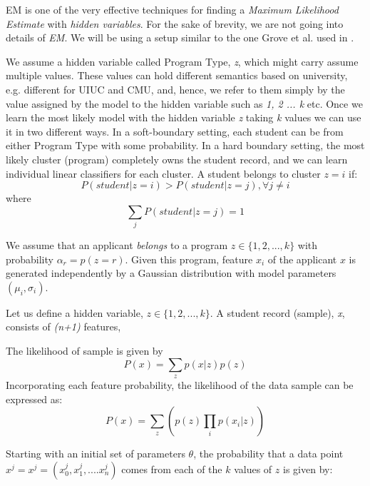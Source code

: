 \documentclass{sig-alternate-05-2015}
\begin{document}
EM is one of the very effective techniques for finding a \textit{Maximum Likelihood Estimate} with \textit{hidden variables}. For the sake of brevity, we are not going into details of \textit{EM}. We will be using a setup similar to the one Grove et al. used in \cite{GroveRoth}.

We assume a hidden variable called Program Type, \textit{z}, which might carry assume multiple values. These values can hold different semantics based on university, e.g. different for UIUC and CMU, and, hence, we refer to them simply by the value assigned by the model to the hidden variable such as \textit{1, 2 ... k} etc. Once we learn the most likely model with the hidden variable \textit{z} taking \textit{k} values we can use it in two different ways. In a soft-boundary setting, each student can be from either Program Type with some probability. In a hard boundary setting, the most likely cluster (program) completely owns the student record, and we can learn individual linear classifiers for each cluster. A student belongs to cluster $z=i$ if:
\begin{equation}P(student | z=i) > P(student | z=j), \forall {j\neq i}\end{equation}
where
\begin{equation}
\sum_j P(student | z=j) = 1
\end{equation}

We assume that an applicant \textit{belongs} to a program $ z \in \{1,2,...,k\} $ with probability $\alpha_r = p(z=r)$. Given this program, feature $x_i$ of the applicant $x$ is generated independently by a Gaussian distribution with model parameters $(\mu_i, \sigma_i)$.

Let us define a hidden variable, $ z \in \{1,2,...,k\} $. A student record (sample), \textit{x}, consists of \textit{(n+1)} features,

The likelihood of sample is given by
\begin{equation}
P(x) = \sum_z p(x | z) p(z)
\end{equation}
Incorporating each feature probability, the likelihood of the data sample can be expressed as:
\begin{equation}
P(x) = \sum_z \left( p(z) \prod_i p(x_i | z) \right)
\end{equation}

Starting with an initial set of parameters $\theta$, the probability that a data point $x^j = x^j = (x_0^j,x_1^j, ....x_n^j)$ comes from each of the $k$ values of $z$ is given by:
\end{document}
